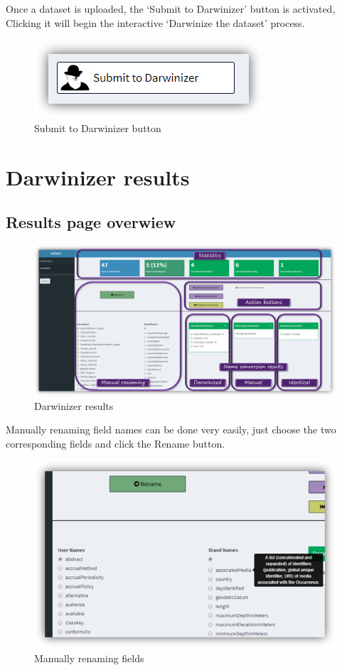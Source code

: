 \documentclass[]{book}
\theoremstyle{definition}
\theoremstyle{definition}
\theoremstyle{definition}
\theoremstyle{remark}
\begin{document}
Once a dataset is uploaded, the `Submit to Darwinizer' button is
activated, Clicking it will begin the interactive `Darwinize the
dataset' process.

\begin{figure}
\centering
\includegraphics{img/bdDwC_Submit.png}
\caption{Submit to Darwinizer button}
\end{figure}

\section{Darwinizer results}\label{darwinizer-results}

\subsection{Results page overwiew}\label{results-page-overwiew}

\begin{figure}
\centering
\includegraphics{img/bdDwC_Darwinizer_results.png}
\caption{Darwinizer results}
\end{figure}

Manually renaming field names can be done very easily, just choose the
two corresponding fields and click the Rename button.

\begin{figure}
\centering
\includegraphics{img/bdDwC_Manual_rename.png}
\caption{Manually renaming fields}
\end{figure}
\end{document}
